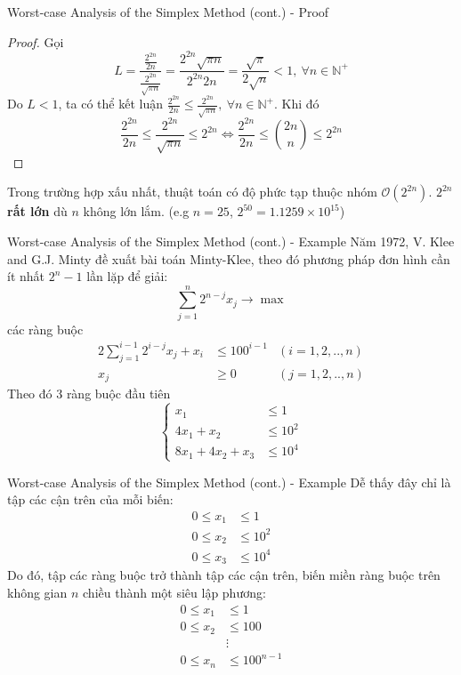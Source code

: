 \documentclass[10pt]{beamer}
\begin{document}
\begin{frame}{Worst-case Analysis of the Simplex Method (cont.) - Proof}
\begin{proof}
Gọi
$$
\displaystyle
L = \frac{\frac{2^{2n}}{2n}}{\frac{2^{2n}}{\sqrt{\pi n}}} = \frac{2^{2n}\sqrt{\pi n}}{2^{2n} 2n} = \frac{\sqrt{\pi}}{2\sqrt{n}} < 1,\ \forall n \in \mathbb{N^+}
$$
Do $L < 1$, ta có thể kết luận $\frac{2^{2n}}{2n} \leq \frac{2^{2n}}{\sqrt{\pi n}},\ \forall n \in \mathbb{N^+}
$. Khi đó
$$
\displaystyle
\frac{2^{2n}}{2n} \leq \frac{2^{2n}}{\sqrt{\pi n}} \leq 2^{2n} \iff \frac{2^{2n}}{2n} \leq \binom{2n}{n} \leq 2^{2n}
$$
\end{proof}
Trong trường hợp xấu nhất, thuật toán có độ phức tạp thuộc nhóm $\mathcal{O}(2^{2n})$. $2^{2n}$ \textbf{rất lớn} dù $n$ không lớn lắm. (e.g $n = 25$, $2^{50} = 1.1259\times 10^{15}$)
\end{frame}

\begin{frame}{Worst-case Analysis of the Simplex Method (cont.) - Example}
Năm 1972, V. Klee and G.J. Minty\cite{klee1970good} đề xuất bài toán Minty-Klee, theo đó phương pháp đơn hình cần ít nhất $2^n - 1$ lần lặp để giải:
\begin{equation*}
\sum_{j = 1}^{n} 2^{n - j} x_j \rightarrow \max
\end{equation*}
các ràng buộc
\begin{equation*}
\begin{aligned}
2\sum_{j = 1}^{i - 1} 2^{i - j}x_j + x_i &\leq 100^{i - 1} & (i = 1, 2, .., n)\\
x_j &\geq 0 & (j = 1, 2, .., n)
\end{aligned}
\end{equation*}
Theo đó 3 ràng buộc đầu tiên
$$
\left\{
\begin{array}{lll}
x_1 &\leq 1\\
4x_1 + x_2 &\leq 10^2\\
8x_1 + 4x_2 + x_3 &\leq 10^4
\end{array}
\right.
$$
\end{frame}

\begin{frame}{Worst-case Analysis of the Simplex Method (cont.) - Example}
Dễ thấy đây chỉ là tập các cận trên của mỗi biến:
$$
\begin{array}{lll}
0 \leq x_1 &\leq 1\\
0 \leq x_2 &\leq 10^2\\
0 \leq x_3 &\leq 10^4
\end{array}
$$
Do đó, tập các ràng buộc trở thành tập các cận trên, biến miền ràng buộc trên không gian $n$ chiều thành một siêu lập phương:
$$
\begin{array}{lll}
0 \leq x_1 &\leq 1\\
0 \leq x_2 &\leq 100\\
&\vdots\\
0 \leq x_n &\leq 100^{n - 1}
\end{array}
$$
\end{frame}
\end{document}

